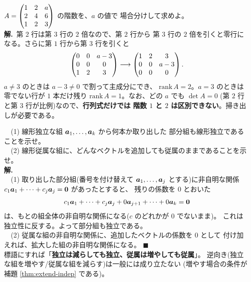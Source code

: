 \begin{rei}[例題・標準(パラメータを含む階数)]\label{rei:rank-case}
$A = \begin{pmatrix}1 & 2 & a \\ 2 & 4 & 6 \\ 1 & 2 & 3\end{pmatrix}$ の階数を、$a$ の値で
場合分けして求めよ。\\
\textbf{解.}\ 第 $2$ 行は第 $3$ 行の $2$ 倍なので、第 $2$ 行から
第 $3$ 行の $2$ 倍を引くと零行になる。さらに第 $1$ 行から第 $3$ 行を引くと
\[
\begin{pmatrix}0 & 0 & a - 3 \\ 0 & 0 & 0 \\ 1 & 2 & 3\end{pmatrix}
\longrightarrow
\begin{pmatrix}1 & 2 & 3 \\ 0 & 0 & a - 3 \\ 0 & 0 & 0\end{pmatrix}.
\]
$a \neq 3$ のときは $a - 3 \neq 0$ で割って主成分にでき、
$\mathrm{rank}\,A = 2$。$a = 3$ のときは零でない行が $1$ 本だけ残り
$\mathrm{rank}\,A = 1$。なお、どの $a$ でも $\det A = 0$
(第 $2$ 行と第 $3$ 行が比例)なので、\textbf{行列式だけでは
階数 $1$ と $2$ は区別できない}。掃き出しが必要である。
\end{rei}

\begin{rei}[例題・標準(証明:部分組と独立性)]\label{rei:rank-subset}
　(1) 線形独立な組 $\bm{a}_1, \dots, \bm{a}_k$ から何本か取り出した
部分組も線形独立であることを示せ。\\
　(2) 線形従属な組に、どんなベクトルを追加しても従属のままであることを示せ。\\
\textbf{解.}\\
　(1) 取り出した部分組(番号を付け替えて
$\bm{a}_1, \dots, \bm{a}_j$ とする)に非自明な関係
$c_1\bm{a}_1 + \cdots + c_j\bm{a}_j = \bm{0}$ があったとすると、
残りの係数を $0$ とおいた
\[
c_1\bm{a}_1 + \cdots + c_j\bm{a}_j + 0\bm{a}_{j+1} + \cdots
+ 0\bm{a}_k = \bm{0}
\]
は、もとの組全体の非自明な関係になる($c$ のどれかが $0$ でないまま)。
これは独立性に反する。よって部分組も独立である。\\
　(2) 従属な組の非自明な関係に、追加したベクトルの係数を $0$ として
付け加えれば、拡大した組の非自明な関係になる。 $\blacksquare$\\
標語にすれば「\textbf{独立は減らしても独立、従属は増やしても従属}」。
逆向き(独立な組を増やす/従属な組を減らす)は一般には成り立たない
(増やす場合の条件が補題 \ref{thm:extend-indep} である)。
\end{rei}

